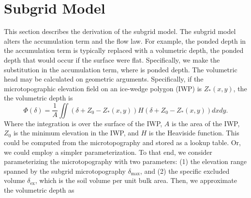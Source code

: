 \documentclass[review,11pt]{elsarticle}
\begin{document}
\section{Subgrid Model}\label{subgridmodel}
This section describes the derivation of the subgrid model. The subgrid model alters the accumulation term and the flow law. For example, the ponded depth in the accumulation term is typically replaced with a volumetric depth, the ponded depth that would occur if the surface were flat. Specifically, we make the substitution in the accumulation term, where is ponded depth. The volumetric head may be calculated on geometric arguments. Specifically, if the microtopographic elevation field on an ice-wedge polygon (IWP) is $Z_*(x,y)$, the the volumetric depth is
\begin{equation}\label{volumetric-depth1}
\Phi (\delta) = \frac{1}{A} \iint \left( \delta + Z_0 - Z_*(x,y) \right ) H \left( \delta + Z_0 - Z_*(x,y) \right ) dx dy.
\end{equation}
Where the integration is over the surface of the IWP, $A$ is the area of the IWP, $Z_0$ is the minimum elevation in the IWP, and $H$ is the Heaviside function. This could be computed from the microtopography and stored as a lookup table. Or, we could employ a simpler parameterization. To that end, we consider parameterizing the microtopography with two parameters: (1) the elevation range spanned by the subgrid microtopography $\delta_\text{max}$, and (2) the specific excluded volume $\delta_\text{ex}$, which is the soil volume per unit bulk area. Then, we approximate the volumetric depth as
\end{document}
